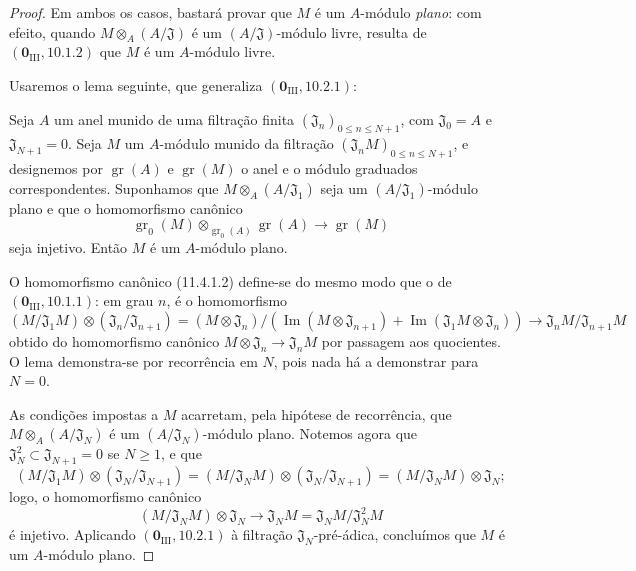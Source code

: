 \begin{proof}
Em ambos os casos, bastará provar
que $M$ é um $A$-módulo
\emph{plano}: com efeito, quando
$M\otimes_A(A/\mathfrak J)$ é
um $(A/\mathfrak J)$-módulo livre,
resulta de
$(\mathbf 0_{\mathrm{III}},10.1.2)$
que $M$ é um $A$-módulo livre.

Usaremos o lema seguinte, que
generaliza
$(\mathbf 0_{\mathrm{III}},10.2.1)$:

\begin{lemma}[11.4.1.1]
\label{IV.11.4.1.1}
Seja $A$ um anel munido de uma
filtração finita
$(\mathfrak J_n)_{0\leq n\leq N+1}$,
com $\mathfrak J_0=A$ e
$\mathfrak J_{N+1}=0$. Seja $M$
um $A$-módulo munido da filtração
$(\mathfrak J_nM)_{0\leq n\leq N+1}$,
e designemos por
$\operatorname{gr}(A)$ e
$\operatorname{gr}(M)$ o anel e o
módulo graduados correspondentes.
Suponhamos que
$M\otimes_A(A/\mathfrak J_1)$
seja um $(A/\mathfrak J_1)$-módulo
plano e que o homomorfismo canônico
\begin{equation}
\operatorname{gr}_0(M)
\otimes_{\operatorname{gr}_0(A)}
\operatorname{gr}(A)
\longrightarrow\operatorname{gr}(M)
\label{IV.11.4.1.2}
\tag{11.4.1.2}
\end{equation}
seja injetivo. Então $M$ é um
$A$-módulo plano.
\end{lemma}

O homomorfismo canônico (11.4.1.2)
define-se do mesmo modo que o de
$(\mathbf 0_{\mathrm{III}},10.1.1)$:
em grau $n$, é o homomorfismo
\[
(M/\mathfrak J_1M)\otimes
(\mathfrak J_n/\mathfrak J_{n+1})
=(M\otimes\mathfrak J_n)/
(\operatorname{Im}
(M\otimes\mathfrak J_{n+1})
+\operatorname{Im}
(\mathfrak J_1M\otimes\mathfrak J_n))
\longrightarrow
\mathfrak J_nM/\mathfrak J_{n+1}M
\]
obtido do homomorfismo canônico
$M\otimes\mathfrak J_n\to
\mathfrak J_nM$ por passagem aos
quocientes. O lema demonstra-se
por recorrência em $N$, pois nada
há a demonstrar para $N=0$.


As condições impostas a $M$
acarretam, pela hipótese de
recorrência, que
$M\otimes_A(A/\mathfrak J_N)$
é um $(A/\mathfrak J_N)$-módulo
plano. Notemos agora que
$\mathfrak J_N^2\subset
\mathfrak J_{N+1}=0$ se $N\geq1$,
e que
\[
(M/\mathfrak J_1M)\otimes
(\mathfrak J_N/\mathfrak J_{N+1})
=(M/\mathfrak J_NM)\otimes
(\mathfrak J_N/\mathfrak J_{N+1})
=(M/\mathfrak J_NM)\otimes
\mathfrak J_N;
\]
logo, o homomorfismo canônico
\[
(M/\mathfrak J_NM)\otimes\mathfrak J_N
\longrightarrow
\mathfrak J_NM
=\mathfrak J_NM/\mathfrak J_N^2M
\]
é injetivo. Aplicando
$(\mathbf 0_{\mathrm{III}},10.2.1)$
à filtração $\mathfrak J_N$-pré-ádica,
concluímos que $M$ é um $A$-módulo
plano.


\end{proof}
